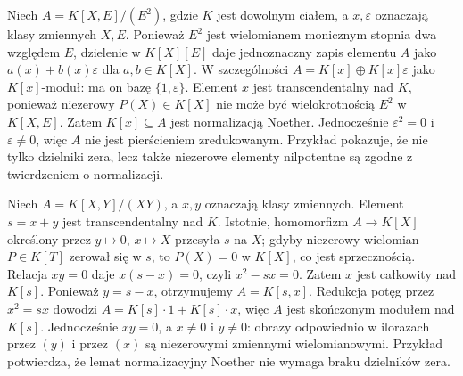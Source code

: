 \begin{przyklad}
\label{aa:prz:noether-nilpotents}
Niech $A=K[X,E]/(E^2)$, gdzie $K$ jest dowolnym ciałem,
a $x,\varepsilon$ oznaczają klasy zmiennych $X,E$.
Ponieważ $E^2$ jest wielomianem monicznym stopnia dwa
względem $E$, dzielenie w $K[X][E]$ daje jednoznaczny
zapis elementu $A$ jako
$a(x)+b(x)\varepsilon$ dla $a,b\in K[X]$.
W szczególności $A=K[x]\oplus K[x]\varepsilon$ jako
$K[x]$-moduł: ma on bazę $\{1,\varepsilon\}$.
Element $x$ jest transcendentalny nad $K$,
ponieważ niezerowy $P(X)\in K[X]$ nie może być
wielokrotnością $E^2$ w $K[X,E]$.
Zatem $K[x]\subseteq A$ jest normalizacją Noether.
Jednocześnie $\varepsilon^2=0$ i $\varepsilon\ne0$,
więc $A$ nie jest pierścieniem zredukowanym.
Przykład pokazuje, że nie tylko dzielniki zera,
lecz także niezerowe elementy nilpotentne są zgodne
z twierdzeniem o normalizacji.
\end{przyklad}

\begin{przyklad}
\label{aa:prz:noether-zero-divisors}
Niech $A=K[X,Y]/(XY)$, a $x,y$ oznaczają klasy zmiennych.
Element $s=x+y$ jest transcendentalny nad $K$.
Istotnie, homomorfizm $A\to K[X]$ określony przez
$y\mapsto0$, $x\mapsto X$ przesyła $s$ na $X$;
gdyby niezerowy wielomian $P\in K[T]$ zerował się w $s$,
to $P(X)=0$ w $K[X]$, co jest sprzecznością.
Relacja $xy=0$ daje $x(s-x)=0$, czyli
$x^2-sx=0$. Zatem $x$ jest całkowity nad $K[s]$.
Ponieważ $y=s-x$, otrzymujemy $A=K[s,x]$.
Redukcja potęg przez $x^2=sx$ dowodzi
$A=K[s]\cdot1+K[s]\cdot x$, więc $A$ jest skończonym
modułem nad $K[s]$. Jednocześnie $xy=0$, a $x\ne0$
i $y\ne0$: obrazy odpowiednio w ilorazach przez $(y)$
i przez $(x)$ są niezerowymi zmiennymi wielomianowymi.
Przykład potwierdza, że lemat normalizacyjny Noether
nie wymaga braku dzielników zera.
\end{przyklad}
